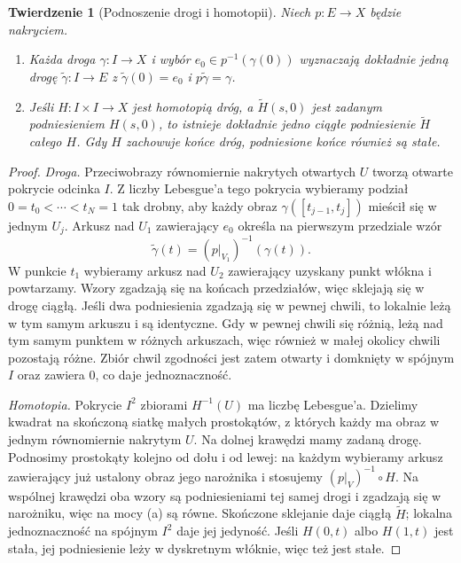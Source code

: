 \documentclass[11pt,a4paper,oneside]{report}
\theoremstyle{plain}
\newtheorem{twierdzenie}{Twierdzenie}[section]
\theoremstyle{definition}
\theoremstyle{remark}
\begin{document}
\begin{twierdzenie}[Podnoszenie drogi i homotopii]
\label{thm:podnoszenie-nakrycie}
Niech $p:E\to X$ będzie nakryciem.
\begin{enumerate}[label=(\alph*),leftmargin=*]
\item Każda droga $\gamma:I\to X$ i wybór
      $e_0\in p^{-1}(\gamma(0))$ wyznaczają
      dokładnie jedną drogę
      $\widetilde\gamma:I\to E$ z
      $\widetilde\gamma(0)=e_0$ i
      $p\widetilde\gamma=\gamma$.
\item Jeśli $H:I\times I\to X$ jest
      homotopią dróg, a $\widetilde H(s,0)$
      jest zadanym podniesieniem $H(s,0)$,
      to istnieje dokładnie jedno ciągłe
      podniesienie $\widetilde H$ całego $H$.
      Gdy $H$ zachowuje końce dróg,
      podniesione końce również są stałe.
\end{enumerate}
\end{twierdzenie}
\begin{proof}
\emph{Droga.} Przeciwobrazy równomiernie
nakrytych otwartych $U$ tworzą otwarte
pokrycie odcinka $I$. Z liczby Lebesgue'a
tego pokrycia wybieramy podział
$0=t_0<\cdots<t_N=1$ tak drobny, aby
każdy obraz $\gamma([t_{j-1},t_j])$
mieścił się w jednym $U_j$.
Arkusz nad $U_1$ zawierający $e_0$
określa na pierwszym przedziale wzór
\[
 \widetilde\gamma(t)
 =(p|_{V_1})^{-1}(\gamma(t)).
\]
W punkcie $t_1$ wybieramy arkusz nad $U_2$
zawierający uzyskany punkt włókna i powtarzamy.
Wzory zgadzają się na końcach przedziałów,
więc sklejają się w drogę ciągłą.
Jeśli dwa podniesienia zgadzają się w pewnej
chwili, to lokalnie leżą w tym samym arkuszu
i są identyczne. Gdy w pewnej chwili
się różnią, leżą nad tym samym punktem
w różnych arkuszach, więc również w małej
okolicy chwili pozostają różne. Zbiór
chwil zgodności jest zatem otwarty
i domknięty w spójnym $I$ oraz
zawiera $0$, co daje jednoznaczność.

\emph{Homotopia.} Pokrycie $I^2$ zbiorami
$H^{-1}(U)$ ma liczbę Lebesgue'a.
Dzielimy kwadrat na skończoną siatkę
małych prostokątów, z których każdy ma
obraz w jednym równomiernie nakrytym $U$.
Na dolnej krawędzi mamy zadaną drogę.
Podnosimy prostokąty kolejno od dołu i
od lewej: na każdym wybieramy arkusz
zawierający już ustalony obraz jego narożnika
i stosujemy $(p|_V)^{-1}\circ H$.
Na wspólnej krawędzi oba wzory są
podniesieniami tej samej drogi i zgadzają
się w narożniku, więc na mocy (a) są równe.
Skończone sklejanie daje ciągłą
$\widetilde H$; lokalna jednoznaczność
na spójnym $I^2$ daje jej jedyność.
Jeśli $H(0,t)$ albo $H(1,t)$ jest stała,
jej podniesienie leży w dyskretnym włóknie,
więc też jest stałe.
\end{proof}
\end{document}
